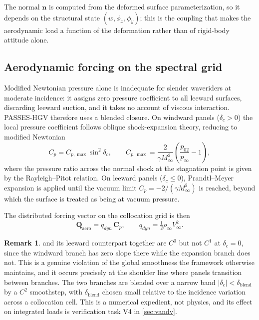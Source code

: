 \documentclass[11pt,a4paper]{article}
\theoremstyle{definition}
\newtheorem{remark}[theorem]{Remark}
\numberwithin{equation}{section}
\begin{document}
The normal $\mathbf{n}$ is computed from the deformed surface parameterization, so it depends on the structural state $(w, \phi_x, \phi_y)$; this is the coupling that makes the aerodynamic load a function of the deformation rather than of rigid-body attitude alone.

\subsection{Aerodynamic forcing on the spectral grid}
\label{sec:forcing}

Modified Newtonian pressure alone is inadequate for slender waveriders at moderate incidence: it assigns zero pressure coefficient to all leeward surfaces, discarding leeward suction, and it takes no account of viscous interaction. PASSES-HGV therefore uses a blended closure. On windward panels ($\delta_c > 0$) the local pressure coefficient follows oblique shock-expansion theory, reducing to modified Newtonian
\begin{equation}
\label{eq:newtonian}
C_p = C_{p,\max} \sin^2 \delta_c,
\qquad
C_{p,\max} = \frac{2}{\gamma M_\infty^2}\left( \frac{p_{02}}{p_\infty} - 1 \right),
\end{equation}
where the pressure ratio across the normal shock at the stagnation point is given by the Rayleigh--Pitot relation. On leeward panels ($\delta_c \le 0$), Prandtl--Meyer expansion is applied until the vacuum limit $C_p = -2/(\gamma M_\infty^2)$ is reached, beyond which the surface is treated as being at vacuum pressure.

The distributed forcing vector on the collocation grid is then
\begin{equation}
\label{eq:qaero}
\mathbf{Q}_{\text{aero}} = q_{dyn}\, \mathbf{C}_p, \qquad q_{dyn} = \tfrac{1}{2}\rho_\infty V_\infty^2 .
\end{equation}

\begin{remark}
 and its leeward counterpart together are $C^0$ but not $C^1$ at $\delta_c = 0$, since the windward branch has zero slope there while the expansion branch does not. This is a genuine violation of the global smoothness the framework otherwise maintains, and it occurs precisely at the shoulder line where panels transition between branches. The two branches are blended over a narrow band $|\delta_c| < \delta_{\text{blend}}$ by a $C^2$ smoothstep, with $\delta_{\text{blend}}$ chosen small relative to the incidence variation across a collocation cell. This is a numerical expedient, not physics, and its effect on integrated loads is verification task V4 in \cref{sec:vandv}.
\end{remark}
\end{document}
